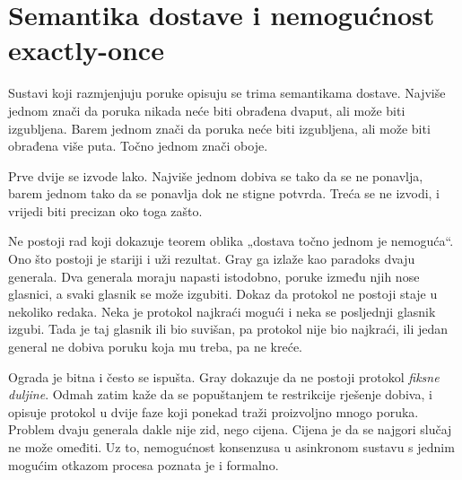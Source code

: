 \section{Semantika dostave i nemogućnost exactly-once}
\label{sec:semantika-dostave}
%
%

Sustavi koji razmjenjuju poruke opisuju se trima semantikama dostave.
Najviše jednom znači da poruka nikada neće biti obrađena dvaput, ali može
biti izgubljena. Barem jednom znači da poruka neće biti izgubljena, ali
može biti obrađena više puta. Točno jednom znači oboje.

Prve dvije se izvode lako. Najviše jednom dobiva se tako da se ne ponavlja,
barem jednom tako da se ponavlja dok ne stigne potvrda. Treća se ne izvodi,
i vrijedi biti precizan oko toga zašto.

Ne postoji rad koji dokazuje teorem oblika „dostava točno jednom je
nemoguća“. Ono što postoji je stariji i uži rezultat. Gray ga izlaže kao
paradoks dvaju generala\cite{gray1978notes}. Dva generala moraju napasti
istodobno, poruke između njih nose glasnici, a svaki glasnik se može
izgubiti. Dokaz da protokol ne postoji staje u nekoliko redaka. Neka je
protokol najkraći mogući i neka se posljednji glasnik izgubi. Tada je taj
glasnik ili bio suvišan, pa protokol nije bio najkraći, ili jedan general
ne dobiva poruku koja mu treba, pa ne kreće.

Ograda je bitna i često se ispušta. Gray dokazuje da ne postoji protokol
\emph{fiksne duljine}. Odmah zatim kaže da se popuštanjem te restrikcije
rješenje dobiva, i opisuje protokol u dvije faze koji ponekad traži
proizvoljno mnogo poruka. Problem dvaju generala dakle nije zid, nego cijena.
Cijena je da se najgori slučaj ne može omeđiti. Uz to, nemogućnost
konsenzusa u asinkronom sustavu s jednim mogućim otkazom procesa poznata je
i formalno\cite{fischer1985impossibility}.

